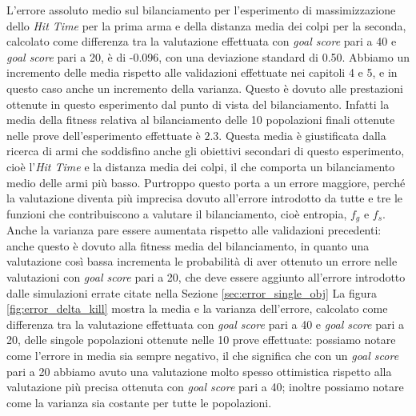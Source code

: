 \documentclass[12pt, italian]{toptesi}
\begin{document}
L'errore assoluto medio sul bilanciamento per l'esperimento di massimizzazione dello \emph{Hit Time} per la prima arma e della distanza media dei colpi per la seconda, calcolato come differenza tra la valutazione effettuata con \emph{goal score} pari a 40 e \emph{goal score} pari a 20, è di -0.096, con una deviazione standard di 0.50.
Abbiamo un incremento delle media rispetto alle validazioni effettuate nei capitoli 4 e 5, e in questo caso anche un incremento della varianza. Questo è dovuto alle prestazioni ottenute in questo esperimento dal punto di vista del bilanciamento.
Infatti la media della fitness relativa al bilanciamento delle 10 popolazioni finali ottenute nelle prove dell'esperimento effettuate è $2.3$. 
Questa media è giustificata dalla ricerca di armi che soddisfino anche gli obiettivi secondari di questo esperimento, cioè l'\emph{Hit Time} e la distanza media dei colpi, il che comporta un bilanciamento medio delle armi più basso.
Purtroppo questo porta a un errore maggiore, perché la valutazione diventa più imprecisa dovuto all'errore introdotto da tutte e tre le funzioni che contribuiscono a valutare il bilanciamento, cioè entropia, $f_g$ e $f_s$.
Anche la varianza pare essere aumentata rispetto alle validazioni precedenti: anche questo è dovuto alla fitness media del bilanciamento, in quanto una valutazione così bassa incrementa le probabilità di aver ottenuto un errore nelle valutazioni con \emph{goal score} pari a 20, che deve essere aggiunto all'errore introdotto dalle simulazioni errate citate nella Sezione \ref{sec:error_single_obj} 
La figura \ref{fig:error_delta_kill} mostra la media e la varianza dell'errore, calcolato come differenza tra la valutazione effettuata con \emph{goal score} pari a 40 e \emph{goal score} pari a 20, delle singole popolazioni ottenute nelle 10 prove effettuate: possiamo notare come l'errore in media sia sempre negativo, il che significa che con un \emph{goal score} pari a 20 abbiamo avuto una valutazione molto spesso ottimistica rispetto alla valutazione più precisa ottenuta con \emph{goal score} pari a 40; inoltre possiamo notare come la varianza sia costante per tutte le popolazioni.
\end{document}
